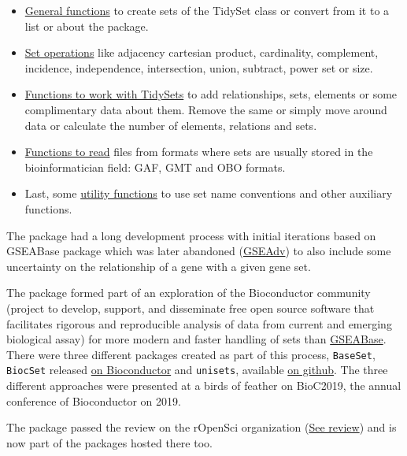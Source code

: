 \documentclass[
  12pt,
  a4paper,
  twoside,
  openright]{book}
\begin{document}
\begin{itemize}
\item
  \href{https://docs.ropensci.org/BaseSet/reference/index.html\#general}{General functions} to create sets of the TidySet class or convert from it to a list or about the package.
\item
  \href{https://docs.ropensci.org/BaseSet/reference/index.html\#set-operations}{Set operations} like adjacency cartesian product, cardinality, complement, incidence, independence, intersection, union, subtract, power set or size.
\item
  \href{https://docs.ropensci.org/BaseSet/reference/index.html\#set-operations}{Functions to work with TidySets} to add relationships, sets, elements or some complimentary data about them.
  Remove the same or simply move around data or calculate the number of elements, relations and sets.
\item
  \href{https://docs.ropensci.org/BaseSet/reference/index.html\#reading-files}{Functions to read} files from formats where sets are usually stored in the bioinformatician field: GAF, GMT and OBO formats.
\item
  Last, some \href{https://docs.ropensci.org/BaseSet/reference/index.html\#utiles}{utility functions} to use set name conventions and other auxiliary functions.
\end{itemize}

The package had a long development process with initial iterations based on GSEABase package which was later abandoned (\href{https://github.com/llrs/GSEAdv}{GSEAdv}) to also include some uncertainty on the relationship of a gene with a given gene set.

The package formed part of an exploration of the Bioconductor community (project to develop, support, and disseminate free open source software that facilitates rigorous and reproducible analysis of data from current and emerging biological assay) for more modern and faster handling of sets than \href{https://bioconductor.org/packages/GSEABase}{GSEABase}.
There were three different packages created as part of this process, \texttt{BaseSet}, \texttt{BiocSet} released \href{https://bioconductor.org/packages/BiocSet/}{on Bioconductor} and \texttt{unisets}, available \href{https://github.com/kevinrue/unisets}{on github}.
The three different approaches were presented at a birds of feather on BioC2019, the annual conference of Bioconductor on 2019.

The package passed the review on the rOpenSci organization (\href{https://github.com/ropensci/software-review/issues/359}{See review}) and is now part of the packages hosted there too.
\end{document}
